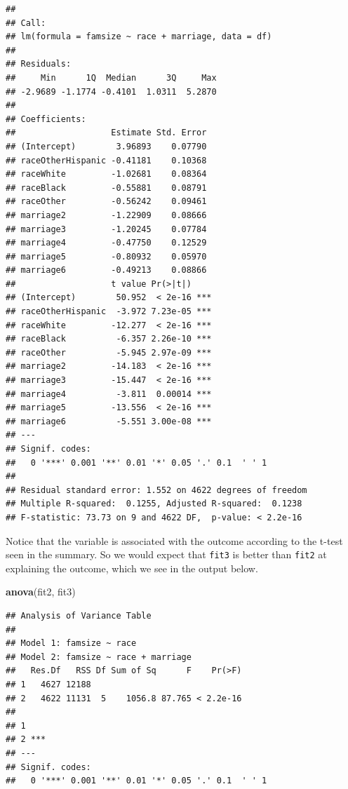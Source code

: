 \documentclass[]{tufte-book}
\newenvironment{Shaded}{}{}
\newcommand{\KeywordTok}[1]{\textcolor[rgb]{0.00,0.44,0.13}{\textbf{#1}}}
\newcommand{\NormalTok}[1]{#1}
\theoremstyle{definition}
\theoremstyle{definition}
\theoremstyle{remark}
\begin{document}
\begin{verbatim}
## 
## Call:
## lm(formula = famsize ~ race + marriage, data = df)
## 
## Residuals:
##     Min      1Q  Median      3Q     Max 
## -2.9689 -1.1774 -0.4101  1.0311  5.2870 
## 
## Coefficients:
##                   Estimate Std. Error
## (Intercept)        3.96893    0.07790
## raceOtherHispanic -0.41181    0.10368
## raceWhite         -1.02681    0.08364
## raceBlack         -0.55881    0.08791
## raceOther         -0.56242    0.09461
## marriage2         -1.22909    0.08666
## marriage3         -1.20245    0.07784
## marriage4         -0.47750    0.12529
## marriage5         -0.80932    0.05970
## marriage6         -0.49213    0.08866
##                   t value Pr(>|t|)    
## (Intercept)        50.952  < 2e-16 ***
## raceOtherHispanic  -3.972 7.23e-05 ***
## raceWhite         -12.277  < 2e-16 ***
## raceBlack          -6.357 2.26e-10 ***
## raceOther          -5.945 2.97e-09 ***
## marriage2         -14.183  < 2e-16 ***
## marriage3         -15.447  < 2e-16 ***
## marriage4          -3.811  0.00014 ***
## marriage5         -13.556  < 2e-16 ***
## marriage6          -5.551 3.00e-08 ***
## ---
## Signif. codes:  
##   0 '***' 0.001 '**' 0.01 '*' 0.05 '.' 0.1  ' ' 1
## 
## Residual standard error: 1.552 on 4622 degrees of freedom
## Multiple R-squared:  0.1255, Adjusted R-squared:  0.1238 
## F-statistic: 73.73 on 9 and 4622 DF,  p-value: < 2.2e-16
\end{verbatim}

Notice that the variable is associated with the outcome according to the
t-test seen in the summary. So we would expect that \texttt{fit3} is
better than \texttt{fit2} at explaining the outcome, which we see in the
output below.

\begin{Shaded}
\begin{Highlighting}[]
\KeywordTok{anova}\NormalTok{(fit2, fit3)}
\end{Highlighting}
\end{Shaded}

\begin{verbatim}
## Analysis of Variance Table
## 
## Model 1: famsize ~ race
## Model 2: famsize ~ race + marriage
##   Res.Df   RSS Df Sum of Sq      F    Pr(>F)
## 1   4627 12188                              
## 2   4622 11131  5    1056.8 87.765 < 2.2e-16
##      
## 1    
## 2 ***
## ---
## Signif. codes:  
##   0 '***' 0.001 '**' 0.01 '*' 0.05 '.' 0.1  ' ' 1
\end{verbatim}
\end{document}

